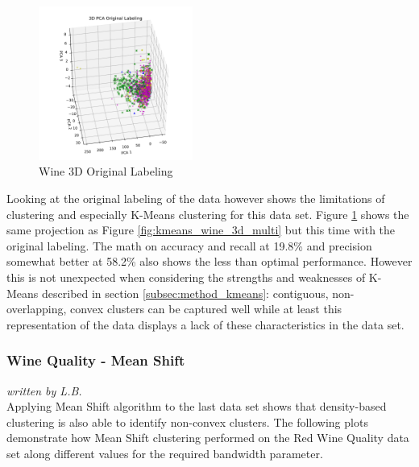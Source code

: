 \newpage
\vspace{-0.5cm}
\begin{figure}
  \centering
    \includegraphics[trim={1cm 0cm 1cm 1cm},width=0.45\textwidth, clip]{images/kmeans_wine_pca_original.pdf}
  \caption{Wine 3D Original Labeling}
  \label{fig:kmeans_wine_pca_original}
\end{figure}

Looking at the original labeling of the data however shows the limitations of clustering and especially K-Means clustering for this data set. Figure \ref{fig:kmeans_wine_pca_original} shows the same projection as Figure \ref{fig:kmeans_wine_3d_multi} but this time with the original labeling. The math on accuracy and recall at 19.8\% and precision somewhat better at 58.2\% also shows the less than optimal performance. However this is not unexpected when considering the strengths and weaknesses of K-Means described in section \ref{subsec:method_kmeans}: contiguous, non-overlapping, convex clusters can be captured well while at least this representation of the data displays a lack of these characteristics in the data set.


\subsubsection{Wine Quality - Mean Shift}
\textit{written by L.B.}\\

Applying Mean Shift algorithm to the last data set shows that density-based clustering is also able to identify non-convex clusters. The following plots demonstrate how Mean Shift clustering performed on the Red Wine Quality data set along different values for the required bandwidth parameter.

